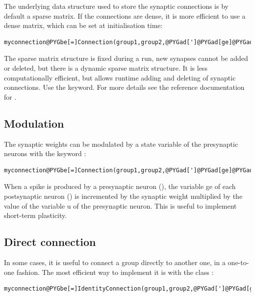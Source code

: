 \documentclass[letterpaper,10pt,english]{manual}
\begin{document}
The underlying data structure used to store the synaptic connections is by default a sparse
matrix. If the connections are dense, it is more efficient to use a dense matrix, which can be
set at initialisation time:

\begin{Verbatim}[commandchars=@\[\]]
myconnection@PYGbe[=]Connection(group1,group2,@PYGad[']@PYGad[ge]@PYGad['],structure@PYGbe[=]@PYGad[']@PYGad[dense]@PYGad['])
\end{Verbatim}

The sparse matrix structure is fixed during a run, new synapses cannot be added or deleted,
but there is a dynamic sparse matrix structure. It is less computationally efficient, but
allows runtime adding and deleting of synaptic connections. Use the 
keyword. For more details see the reference documentation for \hyperlink{brian.Connection}{}.


\subsection{Modulation}

The synaptic weights can be modulated by a state variable of the presynaptic neurons with
the keyword :

\begin{Verbatim}[commandchars=@\[\]]
myconnection@PYGbe[=]Connection(group1,group2,@PYGad[']@PYGad[ge]@PYGad['],modulation@PYGbe[=]@PYGad[']@PYGad[u]@PYGad['])
\end{Verbatim}

When a spike is produced by a presynaptic neuron (), the variable ge of each postsynaptic
neuron () is incremented by the synaptic weight multiplied by the value of the variable u
of the presynaptic neuron. This is useful to implement short-term plasticity.


\subsection{Direct connection}

In some cases, it is useful to connect a group directly to another one, in a one-to-one fashion.
The most efficient way to implement it is with the class \hyperlink{brian.IdentityConnection}{}:

\begin{Verbatim}[commandchars=@\[\]]
myconnection@PYGbe[=]IdentityConnection(group1,group2,@PYGad[']@PYGad[ge]@PYGad['],weight@PYGbe[=]@PYGaw[1]@PYGbe[*]nS)
\end{Verbatim}
\end{document}
